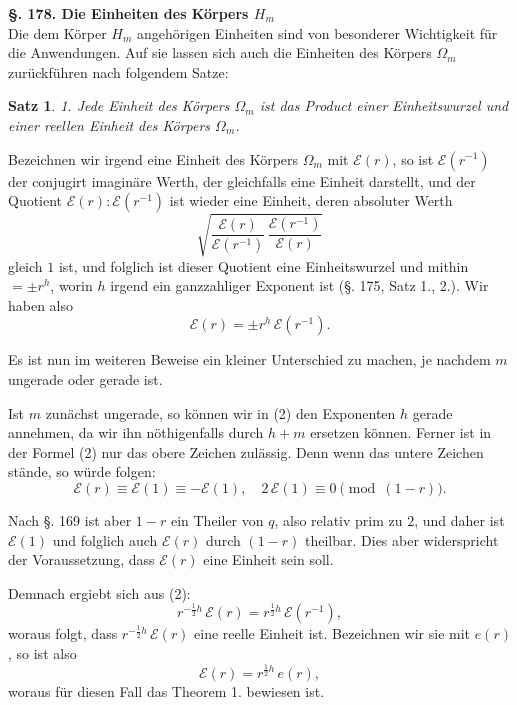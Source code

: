 \documentclass[12pt,a4paper]{article}
\newtheorem*{satz}{Satz}
\begin{document}
\bigskip\noindent\textbf{\S. 178. Die Einheiten des Körpers $H_m$}\\[4pt]

Die dem Körper $H_m$ angehörigen Einheiten sind von besonderer Wichtigkeit für die Anwendungen. Auf sie lassen sich auch die Einheiten des Körpers $\Omega_m$ zurückführen nach folgendem Satze:

\begin{satz}
1. Jede Einheit des Körpers $\Omega_m$ ist das Product einer Einheitswurzel und einer reellen Einheit des Körpers $\Omega_m$.
\end{satz}

Bezeichnen wir irgend eine Einheit des Körpers $\Omega_m$ mit $\mathcal{E}(r)$, so ist $\mathcal{E}(r^{-1})$ der conjugirt imaginäre Werth, der gleichfalls eine Einheit darstellt, und der Quotient $\mathcal{E}(r) : \mathcal{E}(r^{-1})$ ist wieder eine Einheit, deren absoluter Werth
\begin{equation}\label{eq:178-1}
\sqrt{\frac{\mathcal{E}(r)}{\mathcal{E}(r^{-1})}\,\frac{\mathcal{E}(r^{-1})}{\mathcal{E}(r)}}
\end{equation}
gleich $1$ ist, und folglich ist dieser Quotient eine Einheitswurzel und mithin $= \pm r^h$, worin $h$ irgend ein ganzzahliger Exponent ist (\S. 175, Satz 1., 2.). Wir haben also
\begin{equation}\label{eq:178-2}
\mathcal{E}(r) = \pm r^h\, \mathcal{E}(r^{-1}).
\end{equation}

Es ist nun im weiteren Beweise ein kleiner Unterschied zu machen, je nachdem $m$ ungerade oder gerade ist.

Ist $m$ zunächst ungerade, so können wir in (2) den Exponenten $h$ gerade annehmen, da wir ihn nöthigenfalls durch $h + m$ ersetzen können. Ferner ist in der Formel (2) nur das obere Zeichen zulässig. Denn wenn das untere Zeichen stände, so würde folgen:
\[
\mathcal{E}(r) \equiv \mathcal{E}(1) \equiv -\mathcal{E}(1),\quad 2\,\mathcal{E}(1) \equiv 0 \pmod{(1-r)}.
\]

Nach \S. 169 ist aber $1 - r$ ein Theiler von $q$, also relativ prim zu $2$, und daher ist $\mathcal{E}(1)$ und folglich auch $\mathcal{E}(r)$ durch $(1-r)$ theilbar. Dies aber widerspricht der Voraussetzung, dass $\mathcal{E}(r)$ eine Einheit sein soll.

Demnach ergiebt sich aus (2):
\[
r^{-\frac{1}{2}h}\,\mathcal{E}(r) = r^{\frac{1}{2}h}\,\mathcal{E}(r^{-1}),
\]
woraus folgt, dass $r^{-\frac{1}{2}h}\,\mathcal{E}(r)$ eine reelle Einheit ist. Bezeichnen wir sie mit $e(r)$, so ist also
\begin{equation}\label{eq:178-3}
\mathcal{E}(r) = r^{\frac{1}{2}h}\, e(r),
\end{equation}
woraus für diesen Fall das Theorem 1. bewiesen ist.
\end{document}
